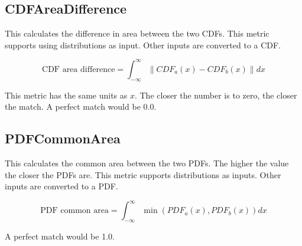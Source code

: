 \subsection{CDFAreaDifference}

This calculates the difference in area between the two CDFs.  This
metric supports using distributions as input.  Other inputs are
converted to a CDF.

\begin{equation}
  \text{CDF area difference} = \int_{-\infty}^{\infty}{\|CDF_a(x)-CDF_b(x)\|dx}
\end{equation}

This metric has the same units as $x$.  The closer the number is
to zero, the closer the match.  A perfect match would be 0.0.

\subsection{PDFCommonArea}

This calculates the common area between the two PDFs.  The higher the
value the closer the PDFs are.  This metric supports distributions as
inputs.  Other inputs are converted to a PDF.

\begin{equation}
  \text{PDF common area} = \int_{-\infty}^{\infty}{\min(PDF_a(x),PDF_b(x))}dx
\end{equation}

A perfect match would be 1.0.
